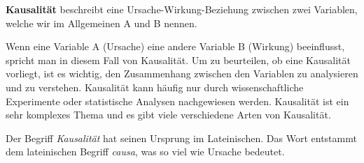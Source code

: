 \begin{mydefinition}[Kausalität]\label{def:kausalitaet}
\textbf{Kausalität} beschreibt eine Ursache-Wirkung-Beziehung zwischen zwei Variablen, welche wir im Allgemeinen A und B nennen.

Wenn eine Variable A (Ursache) eine andere Variable B (Wirkung) beeinflusst, spricht man in diesem Fall von Kausalität. Um zu beurteilen, ob eine Kausalität vorliegt, ist es wichtig, den Zusammenhang zwischen den Variablen zu analysieren und zu verstehen. Kausalität kann häufig nur durch wissenschaftliche  Experimente oder statistische Analysen nachgewiesen werden. Kausalität ist ein sehr komplexes Thema und es gibt viele verschiedene Arten von Kausalität.

Der Begriff \textit{Kausalität} hat seinen Ursprung im Lateinischen. Das Wort entstammt dem lateinischen Begriff \textit{causa}, was so viel wie Ursache bedeutet.


\end{mydefinition}
